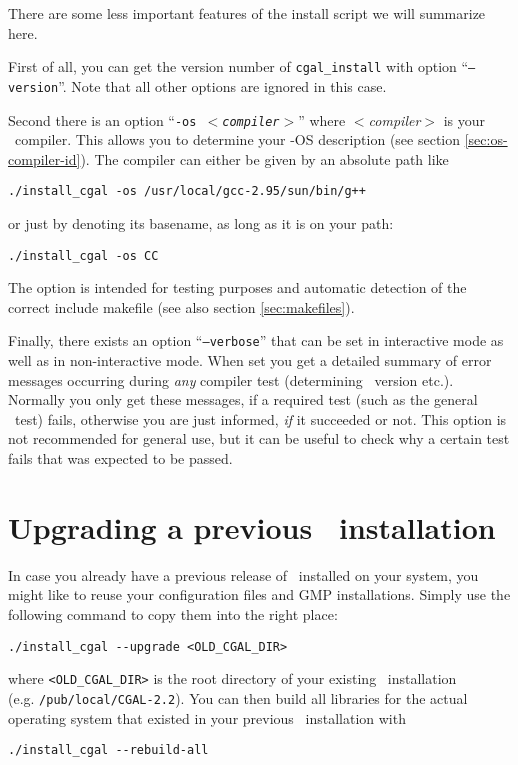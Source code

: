 There are some less important features of the install script we will
summarize here.

First of all, you can get the version number of \texttt{cgal\_install}
with option ``\texttt{--version}''. Note that all other options are
ignored in this case.

Second there is an option ``\texttt{-os \textit{$<$compiler$>$}}''
where \textit{$<$compiler$>$} is your \CC\ compiler. This allows you
to determine your \cgal-OS description (see section
\ref{sec:os-compiler-id}). The compiler can either be given by an
absolute path like
\begin{verbatim}
./install_cgal -os /usr/local/gcc-2.95/sun/bin/g++
\end{verbatim}
or just by denoting its basename, as long as it is on your path:
\begin{verbatim}
./install_cgal -os CC
\end{verbatim}
The option is intended for testing purposes and automatic detection of
the correct include makefile (see also section \ref{sec:makefiles}).

Finally, there exists an option
``\texttt{--verbose}'' that
can be set in interactive mode as well as in non-interactive mode.
When set you get a detailed summary of error messages occurring during
\textit{any} compiler test (determining \stl\ version etc.). Normally
you only get these messages, if a required test (such as the general
\stl\ test) fails, otherwise you are just informed, \textit{if} it
succeeded or not.  This option is not recommended for general use, but
it can be useful to check why a certain test fails that was expected
to be passed.

\section{Upgrading a previous \cgal\ installation}
\label{sec:upgrade}

In case you already have a previous release of \cgal\ installed on
your system, you might like to reuse your configuration files and GMP
installations. Simply use the following command to copy them into the
right place:
\begin{verbatim}
./install_cgal --upgrade <OLD_CGAL_DIR>
\end{verbatim}
where \texttt{<OLD\_CGAL\_DIR>} is the root directory of your existing
\cgal\ installation\\ (e.g. \texttt{/pub/local/CGAL-2.2}).  You can
then build all libraries for the actual operating system that existed
in your previous \cgal\ installation with
\begin{verbatim}
./install_cgal --rebuild-all
\end{verbatim}

